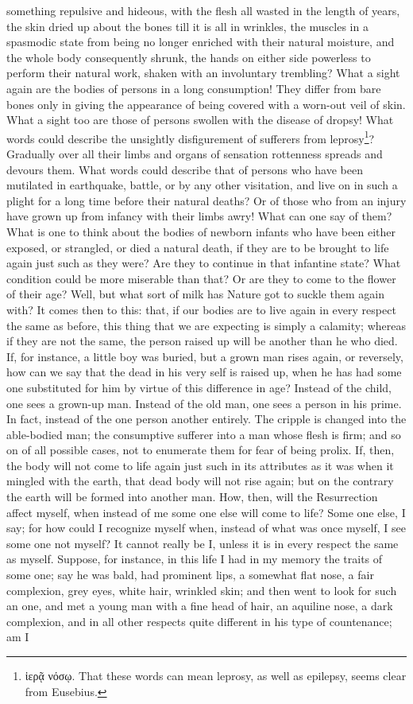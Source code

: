 something repulsive and hideous, with the flesh all wasted in the length of years, the skin dried up about the bones till it is all in wrinkles, the muscles in a spasmodic state from being no longer enriched with their natural moisture, and the whole body consequently shrunk, the hands on either side powerless to perform their natural work, shaken with an involuntary trembling? What a sight again are the bodies of persons in a long consumption! They differ from bare bones only in giving the appearance of being covered with a worn-out veil of skin. What a sight too are those of persons swollen with the disease of dropsy! What words could describe the unsightly disfigurement of sufferers from leprosy\footnote{\textgreek{ἱερᾷ νόσῳ}. That these words can mean leprosy, as well as epilepsy, seems clear from Eusebius.}? Gradually over all their limbs and organs of sensation rottenness spreads and devours them. What words could describe that of persons who have been mutilated in earthquake, battle, or by any other visitation, and live on in such a plight for a long time before their natural deaths? Or of those who from an injury have grown up from infancy with their limbs awry! What can one say of them? What is one to think about the bodies of newborn infants who have been either exposed, or strangled, or died a natural death, if they are to be brought to life again just such as they were? Are they to continue in that infantine state? What condition could be more miserable than that? Or are they to come to the flower of their age? Well, but what sort of milk has Nature got to suckle them again with? It comes then to this: that, if our bodies are to live again in every respect the same as before, this thing that we are expecting is simply a calamity; whereas if they are not the same, the person raised up will be another than he who died. If, for instance, a little boy was buried, but a grown man rises again, or reversely, how can we say that the dead in his very self is raised up, when he has had some one substituted for him by virtue of this difference in age? Instead of the child, one sees a grown-up man. Instead of the old man, one sees a person in his prime. In fact, instead of the one person another entirely. The cripple is changed into the able-bodied man; the consumptive sufferer into a man whose flesh is firm; and so on of all possible cases, not to enumerate them for fear of being prolix. If, then, the body will not come to life again just such in its attributes as it was when it mingled with the earth, that dead body will not rise again; but on the contrary the earth will be formed into another man. How, then, will the Resurrection affect myself, when instead of me some one else will come to life? Some one else, I say; for how could I recognize myself when, instead of what was once myself, I see some one not myself? It cannot really be I, unless it is in every respect the same as myself. Suppose, for instance, in this life I had in my memory the traits of some one; say he was bald, had prominent lips, a somewhat flat nose, a fair complexion, grey eyes, white hair, wrinkled skin; and then went to look for such an one, and met a young man with a fine head of hair, an aquiline nose, a dark complexion, and in all other respects quite different in his type of countenance; am I 
